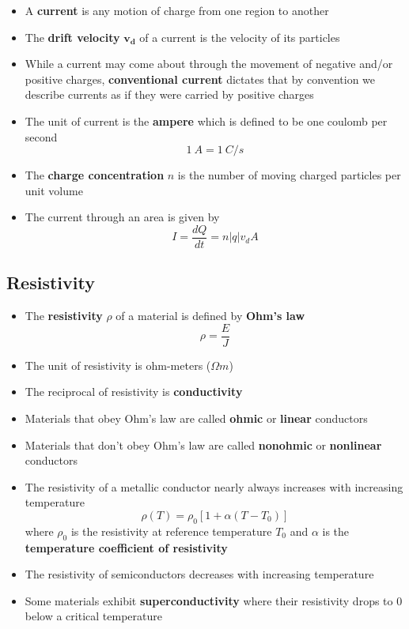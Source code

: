 \documentclass{article}
\begin{document}
\begin{itemize}
  \item A \textbf{current} is any motion of charge from one region to another

  \item The \textbf{drift velocity} $\mathbf{v_d}$ of a current is the velocity of its particles

  \item While a current may come about through the movement of negative and/or positive charges, \textbf{conventional current} dictates that by convention we describe currents as if they were carried by positive charges

  \item The unit of current is the \textbf{ampere} which is defined to be one coulomb per second \[\qty{1}{A} = \qty{1}{C/s}\]

  \item The \textbf{charge concentration} $n$ is the number of moving charged particles per unit volume

  \item The current through an area is given by \[I = \frac{dQ}{dt} = n |q| v_d A\]
\end{itemize}

\subsection{Resistivity}

\begin{itemize}
  \item The \textbf{resistivity} $\rho$ of a material is defined by \textbf{Ohm's law} \[\rho = \frac{E}{J}\]

  \item The unit of resistivity is ohm-meters ($\unit{\Omega m}$)

  \item The reciprocal of resistivity is \textbf{conductivity}

  \item Materials that obey Ohm's law are called \textbf{ohmic} or \textbf{linear} conductors

  \item Materials that don't obey Ohm's law are called \textbf{nonohmic} or \textbf{nonlinear} conductors

  \item The resistivity of a metallic conductor nearly always increases with increasing temperature \[\rho(T) = \rho_0 [1 + \alpha (T - T_0)]\] where $\rho_0$ is the resistivity at reference temperature $T_0$ and $\alpha$ is the \textbf{temperature coefficient of resistivity}

  \item The resistivity of semiconductors decreases with increasing temperature

  \item Some materials exhibit \textbf{superconductivity} where their resistivity drops to 0 below a critical temperature
\end{itemize}
\end{document}
